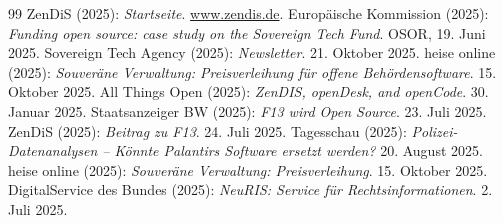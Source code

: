 \documentclass[12pt,a4paper]{article}
\begin{document}
\begin{thebibliography}{99}
		 ZenDiS (2025): \emph{Startseite}. \url{www.zendis.de}.
		 Europäische Kommission (2025): \emph{Funding open source: case study on the Sovereign Tech Fund}. OSOR, 19. Juni 2025.
		 Sovereign Tech Agency (2025): \emph{Newsletter}. 21. Oktober 2025.
		 heise online (2025): \emph{Souveräne Verwaltung: Preisverleihung für offene Behördensoftware}. 15. Oktober 2025.
		 All Things Open (2025): \emph{ZenDIS, openDesk, and openCode}. 30. Januar 2025.
		 Staatsanzeiger BW (2025): \emph{F13 wird Open Source}. 23. Juli 2025.
		 ZenDiS (2025): \emph{Beitrag zu F13}. 24. Juli 2025.
		 Tagesschau (2025): \emph{Polizei-Datenanalysen – Könnte Palantirs Software ersetzt werden?} 20. August 2025.
		 heise online (2025): \emph{Souveräne Verwaltung: Preisverleihung}. 15. Oktober 2025.
		 DigitalService des Bundes (2025): \emph{NeuRIS: Service für Rechtsinformationen}. 2. Juli 2025.
		
	\end{thebibliography}
	
\end{document}

